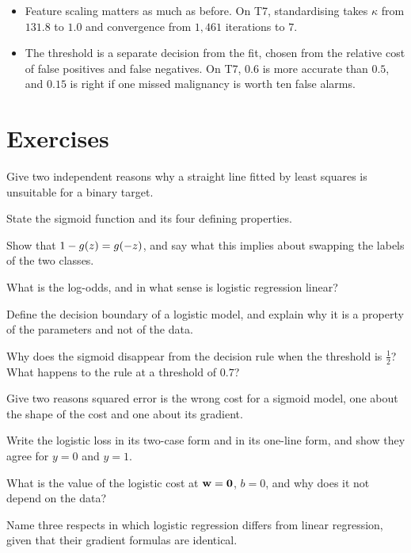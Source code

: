 \begin{itemize}
        expression as linear regression with a different $\mathbf{f}$. Same form,
        different model, different cost, different guarantees.
  \item Feature scaling matters as much as before. On T7, standardising takes
        $\kappa$ from $131.8$ to $1.0$ and convergence from $1{,}461$ iterations
        to $7$.
  \item The threshold is a separate decision from the fit, chosen from the
        relative cost of false positives and false negatives. On T7, $0.6$ is
        more accurate than $0.5$, and $0.15$ is right if one missed malignancy
        is worth ten false alarms.
\end{itemize}

\section*{Exercises}


\sq Give two independent reasons why a straight line fitted by least squares is
unsuitable for a binary target.

\sq State the sigmoid function and its four defining properties.

\sq Show that $1 - g(z) = g(-z)$, and say what this implies about
swapping the labels of the two classes.

\sq What is the log-odds, and in what sense is logistic regression linear?

\sq Define the decision boundary of a logistic model, and explain why it is a
property of the parameters and not of the data.

\sq Why does the sigmoid disappear from the decision rule when the threshold is
$\tfrac12$? What happens to the rule at a threshold of $0.7$?

\sq Give two reasons squared error is the wrong cost for a sigmoid model, one
about the shape of the cost and one about its gradient.

\sq Write the logistic loss in its two-case form and in its one-line form, and
show they agree for $y = 0$ and $y = 1$.

\sq What is the value of the logistic cost at $\mathbf{w} = \mathbf{0}$, $b = 0$, and
why does it not depend on the data?

\sq Name three respects in which logistic regression differs from linear
regression, given that their gradient formulas are identical.

